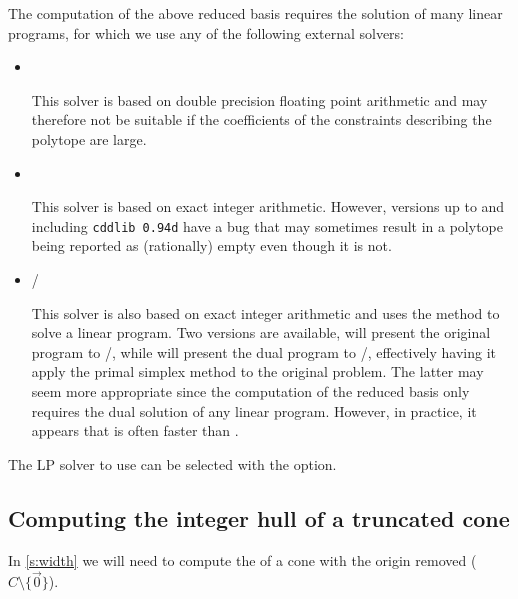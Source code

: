 The computation of the above reduced basis requires the solution
of many linear programs, for which we use any of the following
external solvers:
\begin{itemize}
\item {}~

This solver is based on double precision floating point arithmetic and
may therefore not be suitable if the coefficients of the constraints
describing the polytope are large.

\item {}~

This solver is based on exact integer arithmetic.
However, versions up to and including \verb+cddlib 0.94d+ have
a bug that may sometimes result in a polytope being
reported as (rationally) empty even though it is not.

\item \piplib/~

This solver is also based on exact integer arithmetic
and uses the  method to solve a linear program.
Two versions are available,  will present the
original program to \piplib/, while  will present
the dual program to \piplib/, effectively having it apply the primal
simplex method to the original problem.
The latter may seem more appropriate since the computation
of the reduced basis only requires the dual solution of
any linear program.  However, in practice, it appears
that  is often faster than .
\end{itemize}
The LP solver to use can be selected with the  option.


\subsection{Computing the integer hull of a truncated cone}
\label{s:hull:cone}

In \autoref{s:width} we will need to compute the 
of a cone with the origin removed ($C \setminus \{ \vec 0 \}$).

